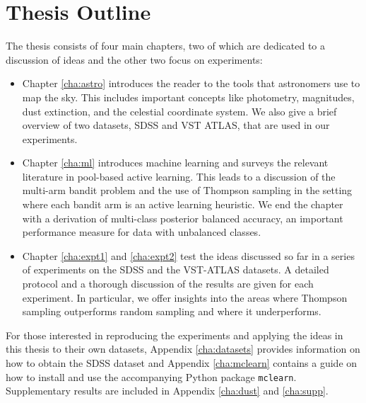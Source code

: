 \section{Thesis Outline}
\label{sec:orgnisation}
The thesis consists of four main chapters, two of which are dedicated to a discussion of ideas and
the other two focus on experiments:
	\begin{itemize}
		\item Chapter \ref{cha:astro} introduces the reader to the tools that astronomers use
		to map the sky. This includes important concepts like photometry, magnitudes, dust
		extinction, and the celestial coordinate system. We also give a brief overview of
		two datasets, SDSS and VST ATLAS, that are used in our experiments.
		
		\item Chapter \ref{cha:ml} introduces machine learning and surveys the relevant literature
		in pool-based active learning. This leads to a discussion of the multi-arm bandit problem
		and the use of Thompson sampling in the setting where each bandit arm is an active learning
		heuristic. We end the chapter with a derivation of multi-class posterior balanced accuracy,
		an important performance measure for data with unbalanced classes.
		
		\item Chapter \ref{cha:expt1} and \ref{cha:expt2} test the ideas discussed so far in a
		series of experiments on the SDSS and the VST-ATLAS datasets. A detailed protocol and a
		thorough discussion of the results are given for each experiment. In particular, we offer
		insights into the areas where Thompson sampling outperforms random sampling and where it
		underperforms. 
	\end{itemize}
For those interested in reproducing the experiments and applying the ideas in this thesis to their
own datasets, Appendix \ref{cha:datasets} provides information on how to obtain the SDSS dataset and
Appendix \ref{cha:mclearn} contains a guide on how to install and use the
accompanying Python package \texttt{mclearn}. Supplementary results are included in Appendix
\ref{cha:dust} and \ref{cha:supp}.

